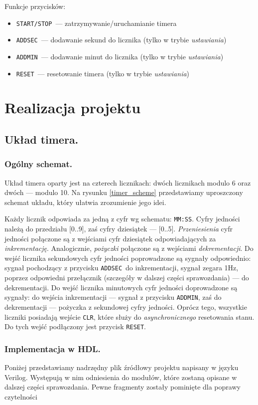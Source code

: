 \documentclass[a4paper,oneside]{report}
\newcommand{\startstop}{\texttt{START/STOP}}
\newcommand{\reset}{\texttt{RESET}}
\newcommand{\addmin}{\texttt{ADD\textunderscore MIN}}
\newcommand{\addsec}{\texttt{ADD\textunderscore SEC}}
\begin{document}
Funkcje przycisków:
\begin{itemize}
	\item \startstop\ --- zatrzymywanie/uruchamianie timera
	\item \addsec\ --- dodawanie sekund do licznika (tylko w trybie
		\emph{ustawiania})
	\item \addmin\ --- dodawanie minut do licznika (tylko w trybie
		\emph{ustawiania})
	\item \reset\ --- resetowanie timera (tylko w trybie
		\emph{ustawiania})
\end{itemize}

\chapter{Realizacja projektu}
\section{Układ timera.}
\subsection{Ogólny schemat.}
Układ timera oparty jest na czterech licznikach: dwóch licznikach
modulo 6 oraz dwóch --- modulo 10. Na rysunku \ref{timer_scheme}
przedstawiamy uproszczony schemat układu, który ułatwia zrozumienie
jego idei.

Każdy licznik odpowiada za jedną z cyfr wg schematu: \texttt{MM:SS}.
Cyfry jedności należą do przedziału [0..9], zaś cyfry dziesiątek ---
[0..5]. \emph{Przeniesienia} cyfr jedności połączone są z wejściami
cyfr dziesiątek odpowiadających za \emph{inkrementację}.
Analogicznie, \emph{pożyczki} połączone są z wejściami
\emph{dekrementacji}. Do wejść licznika sekundowych cyfr jedności
poprowadzone są sygnały odpowiednio: sygnał pochodzący z przycisku
\addsec\ do inkrementacji, sygnał zegara 1Hz, poprzez odpowiedni
przełącznik (szczegóły w dalszej części sprawozdania) --- do
dekrementacji. Do wejść licznika minutowych cyfr jedności
doprowadzone są sygnały: do wejścia inkrementacji --- sygnał z
przycisku \addmin , zaś do dekrementacji --- pożyczka z sekundowej
cyfry jedności. Oprócz tego, wszystkie liczniki posiadają wejście
\texttt{CLR}, które służy do \emph{asynchronicznego} resetowania
stanu. Do tych wejść podłączony jest przycisk \reset .
\subsection{Implementacja w HDL.}
Poniżej przedstawiamy nadrzędny plik źródłowy projektu napisany w
języku Verilog. Występują w nim odniesienia do modułów, które
zostaną opisane w dalszej części sprawozdania. 
Pewne fragmenty zostały pominięte dla poprawy czytelności
\end{document}
